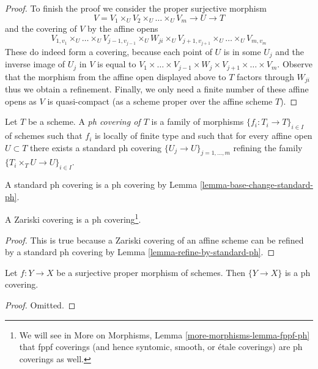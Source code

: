 \begin{proof}
\medskip\noindent
To finish the proof we consider the proper surjective morphism
$$
V = V_1 \times_U V_2 \times_U \ldots \times_U V_m
\longrightarrow U \longrightarrow T
$$
and the covering of $V$ by the affine opens
$$
V_{1, v_1} \times_U \ldots \times_U V_{j - 1, v_{j - 1}}
\times_U W_{j i} \times_U
V_{j + 1, v_{j + 1}} \times_U \ldots \times_U V_{m, v_m}
$$
These do indeed form a covering, because each point of $U$ is
in some $U_j$ and the inverse image of $U_j$ in $V$ is equal to
$V_1 \times \ldots \times V_{j - 1} \times W_j \times V_{j + 1} \times
\ldots \times V_m$. Observe that the morphism from
the affine open displayed above to $T$ factors through $W_{ji}$
thus we obtain a refinement. Finally, we only need a finite number
of these affine opens as $V$ is quasi-compact (as a scheme proper
over the affine scheme $T$).
\end{proof}

\begin{definition}
\label{definition-ph-covering}
Let $T$ be a scheme. A {\it ph covering of $T$} is a family
of morphisms $\{f_i : T_i \to T\}_{i \in I}$ of schemes such
that $f_i$ is locally of finite type and such that for every
affine open $U \subset T$ there exists a standard ph covering
$\{U_j \to U\}_{j = 1, \ldots, m}$ refining the family
$\{T_i \times_T U \to U\}_{i \in I}$.
\end{definition}

\noindent
A standard ph covering is a ph covering by
Lemma \ref{lemma-base-change-standard-ph}.

\begin{lemma}
\label{lemma-zariski-ph}
A Zariski covering is a ph covering\footnote{We will see
in More on Morphisms, Lemma \ref{more-morphisms-lemma-fppf-ph} that
fppf coverings (and hence syntomic, smooth, or \'etale coverings)
are ph coverings as well.}.
\end{lemma}

\begin{proof}
This is true because a Zariski covering of an affine scheme
can be refined by a standard ph covering by
Lemma \ref{lemma-refine-by-standard-ph}.
\end{proof}

\begin{lemma}
\label{lemma-surjective-proper-ph}
Let $f : Y \to X$ be a surjective proper morphism of schemes.
Then $\{Y \to X\}$ is a ph covering.
\end{lemma}

\begin{proof}
Omitted.
\end{proof}

